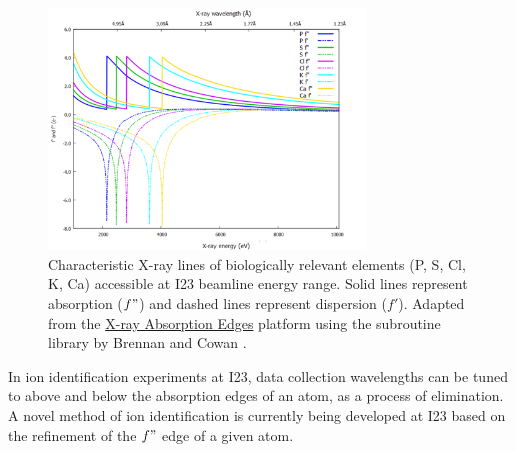 \begin{figure}[h]
    \centering
    \includegraphics[width = 0.75\textwidth]{images/absorption lines high quality cropped.png}
    \caption{Characteristic X-ray lines of biologically relevant elements (P, S, Cl, K, Ca) accessible at I23 beamline energy range. Solid lines represent absorption ($f"$) and dashed lines represent dispersion ($f'$). Adapted from the \href{http://skuld.bmsc.washington.edu/scatter/AS_periodic.html}{X-ray Absorption Edges} platform using the subroutine library by Brennan and Cowan \cite{Brennan1992}.}%
    \label{Anomaluos scattering edges}
\end{figure}

In ion identification experiments at I23, data collection wavelengths can be tuned to above and below the absorption edges of an atom, as a process of elimination. %
A novel method of ion identification is currently being developed at I23 based on the refinement of the $f"$ edge of a given atom.%

